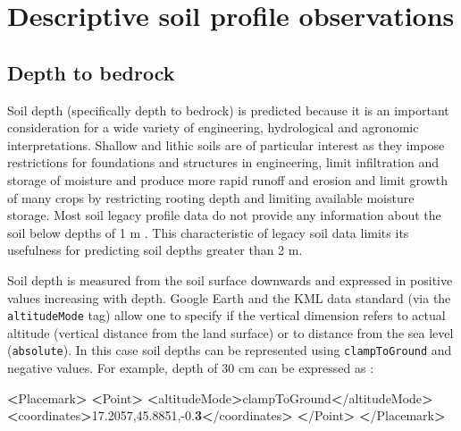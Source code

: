 \documentclass[graybox,natbib,nospthms,UStrade]{svmono}
\newenvironment{Shaded}{\begin{snugshade}}{\end{snugshade}}
\newcommand{\ExtensionTok}[1]{#1}
\newcommand{\NormalTok}[1]{#1}
\newcommand{\OperatorTok}[1]{\textcolor[rgb]{0.43,0.43,0.43}{\textbf{#1}}}
\begin{document}
\hypertarget{descriptive-soil-profile-observations}{%
\section{Descriptive soil profile observations}\label{descriptive-soil-profile-observations}}

\hypertarget{depth-to-bedrock}{%
\subsection{Depth to bedrock}\label{depth-to-bedrock}}

Soil depth (specifically depth to bedrock) is predicted because it is an
important consideration for a wide variety of engineering, hydrological
and agronomic interpretations. Shallow and lithic soils are of
particular interest as they impose restrictions for foundations and
structures in engineering, limit infiltration and storage of moisture
and produce more rapid runoff and erosion and limit growth of many crops
by restricting rooting depth and limiting available moisture storage.
Most soil legacy profile data do not provide any information about the
soil below depths of 1 m \citep{Richter1995}. This characteristic of legacy
soil data limits its usefulness for predicting soil depths greater than
2 m.

Soil depth is measured from the soil surface downwards and expressed in
positive values increasing with depth. Google Earth and the KML data
standard (via the \texttt{altitudeMode} tag) allow one to specify if the
vertical dimension refers to actual altitude (vertical distance from the
land surface) or to distance from the sea level (\texttt{absolute}). In this
case soil depths can be represented using \texttt{clampToGround} and negative
values. For example, depth of 30 cm can be expressed as \citep{OGCKML2008}:

\begin{Shaded}
\begin{Highlighting}[]
\OperatorTok{<}\ExtensionTok{Placemark}\OperatorTok{>} \OperatorTok{<}\NormalTok{Point}\OperatorTok{>}
\OperatorTok{<}\ExtensionTok{altitudeMode}\OperatorTok{>}\NormalTok{clampToGround}\OperatorTok{<}\NormalTok{/altitudeMode}\OperatorTok{>}
\OperatorTok{<}\ExtensionTok{coordinates}\OperatorTok{>}\NormalTok{17.2057,45.8851,-0.}\OperatorTok{3<}\NormalTok{/coordinates}\OperatorTok{>}
\OperatorTok{<}\NormalTok{/}\ExtensionTok{Point}\OperatorTok{>} \OperatorTok{<}\NormalTok{/Placemark}\OperatorTok{>}
\end{Highlighting}
\end{Shaded}
\end{document}
